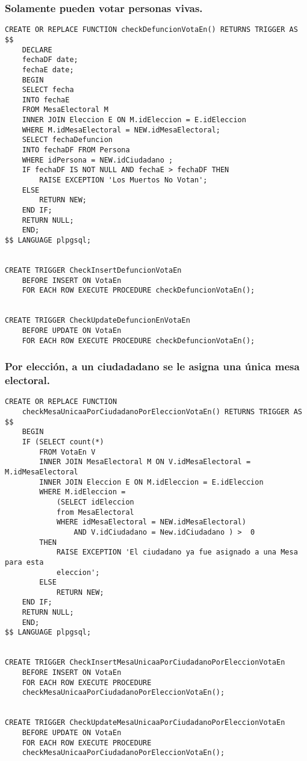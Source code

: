 \subsubsection{Solamente pueden votar personas vivas.}
\begin{verbatim}
CREATE OR REPLACE FUNCTION checkDefuncionVotaEn() RETURNS TRIGGER AS $$
    DECLARE
    fechaDF date;
    fechaE date;
    BEGIN
    SELECT fecha 
    INTO fechaE 
    FROM MesaElectoral M 
    INNER JOIN Eleccion E ON M.idEleccion = E.idEleccion 
    WHERE M.idMesaElectoral = NEW.idMesaElectoral;
    SELECT fechaDefuncion  
    INTO fechaDF FROM Persona 
    WHERE idPersona = NEW.idCiudadano ;  
    IF fechaDF IS NOT NULL AND fechaE > fechaDF THEN
        RAISE EXCEPTION 'Los Muertos No Votan';
    ELSE
        RETURN NEW;
    END IF;
    RETURN NULL;
    END;
$$ LANGUAGE plpgsql;


CREATE TRIGGER CheckInsertDefuncionVotaEn
    BEFORE INSERT ON VotaEn
    FOR EACH ROW EXECUTE PROCEDURE checkDefuncionVotaEn();


CREATE TRIGGER CheckUpdateDefuncionEnVotaEn
    BEFORE UPDATE ON VotaEn
    FOR EACH ROW EXECUTE PROCEDURE checkDefuncionVotaEn();
\end{verbatim}

\subsubsection{Por elección, a un ciudadadano se le asigna una única mesa electoral.}
\begin{verbatim}
CREATE OR REPLACE FUNCTION 
    checkMesaUnicaaPorCiudadanoPorEleccionVotaEn() RETURNS TRIGGER AS $$
    BEGIN
    IF (SELECT count(*) 
        FROM VotaEn V 
        INNER JOIN MesaElectoral M ON V.idMesaElectoral = M.idMesaElectoral 
        INNER JOIN Eleccion E ON M.idEleccion = E.idEleccion
        WHERE M.idEleccion = 
            (SELECT idEleccion 
            from MesaElectoral 
            WHERE idMesaElectoral = NEW.idMesaElectoral) 
                AND V.idCiudadano = New.idCiudadano ) >  0 
        THEN
            RAISE EXCEPTION 'El ciudadano ya fue asignado a una Mesa para esta 
            eleccion';              
        ELSE
            RETURN NEW;
    END IF;
    RETURN NULL;
    END;
$$ LANGUAGE plpgsql;


CREATE TRIGGER CheckInsertMesaUnicaaPorCiudadanoPorEleccionVotaEn
    BEFORE INSERT ON VotaEn
    FOR EACH ROW EXECUTE PROCEDURE 
    checkMesaUnicaaPorCiudadanoPorEleccionVotaEn();


CREATE TRIGGER CheckUpdateMesaUnicaaPorCiudadanoPorEleccionVotaEn
    BEFORE UPDATE ON VotaEn
    FOR EACH ROW EXECUTE PROCEDURE 
    checkMesaUnicaaPorCiudadanoPorEleccionVotaEn();
\end{verbatim}

